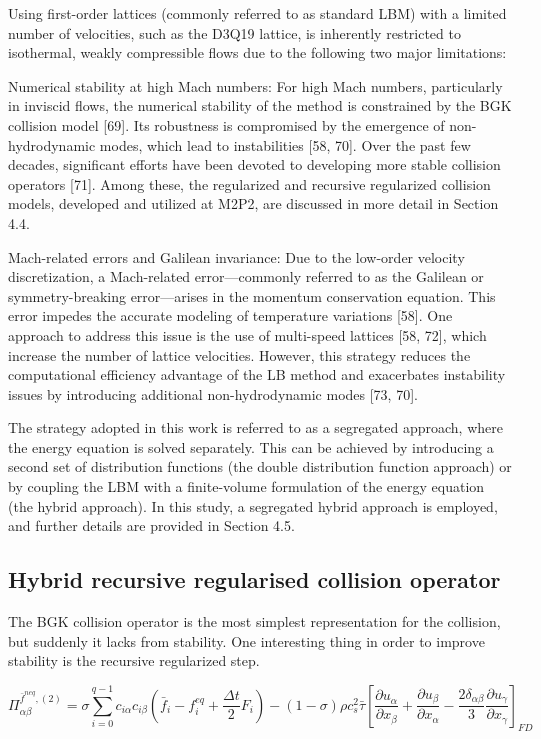 Using first-order lattices (commonly referred to as standard LBM) with a limited
number of velocities, such as the D3Q19 lattice, is inherently restricted to
isothermal, weakly compressible flows due to the following two major
limitations:

    Numerical stability at high Mach numbers: For high Mach numbers,
    particularly in inviscid flows, the numerical stability of the method is
    constrained by the BGK collision model [69]. Its robustness is compromised
    by the emergence of non-hydrodynamic modes, which lead to instabilities [58,
    70]. Over the past few decades, significant efforts have been devoted to
    developing more stable collision operators [71]. Among these, the
    regularized and recursive regularized collision models, developed and
    utilized at M2P2, are discussed in more detail in Section 4.4.

    Mach-related errors and Galilean invariance: Due to the low-order velocity
    discretization, a Mach-related error—commonly referred to as the Galilean or
    symmetry-breaking error—arises in the momentum conservation equation. This
    error impedes the accurate modeling of temperature variations [58]. One
    approach to address this issue is the use of multi-speed lattices [58, 72],
    which increase the number of lattice velocities. However, this strategy
    reduces the computational efficiency advantage of the LB method and
    exacerbates instability issues by introducing additional non-hydrodynamic
    modes [73, 70].

The strategy adopted in this work is referred to as a segregated approach, where
the energy equation is solved separately. This can be achieved by introducing a
second set of distribution functions (the double distribution function approach)
or by coupling the LBM with a finite-volume formulation of the energy equation
(the hybrid approach). In this study, a segregated hybrid approach is employed,
and further details are provided in Section 4.5.

\subsection{Hybrid recursive regularised collision operator}
The BGK collision operator is the most simplest representation for the
collision, but suddenly it lacks from stability. One interesting thing in order
to improve stability is the recursive regularized step. 

\begin{equation}
	\Pi_{\alpha\beta}^{\bar{f}^{neq},(2)} = \sigma\sum_{i=0}^{q-1}c_{i\alpha}c_{i\beta}(\bar{f}_i - f_i^{eq} + \frac{\Delta t}{2}F_i) - (1-\sigma)\rho c_s^2 \bar{\tau}\left[ \frac{\partial u_\alpha}{\partial x_{\beta}} + \frac{\partial u_\beta}{\partial x_{\alpha}} -\frac{2\delta_{\alpha\beta}}{3}\frac{\partial u_\gamma}{\partial x_{\gamma}} \right]_{FD}
\end{equation}

